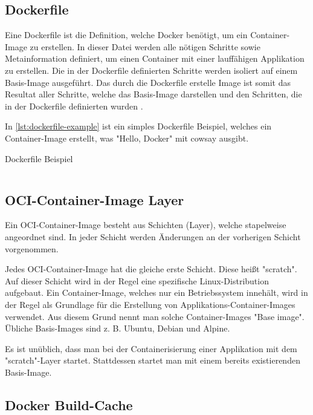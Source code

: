 \subsection{Dockerfile}

Eine Dockerfile ist die Definition, welche Docker benötigt, um ein Container-Image zu erstellen. In dieser Datei werden alle nötigen Schritte sowie Metainformation definiert, um einen Container mit einer lauffähigen Applikation zu erstellen. Die in der Dockerfile definierten Schritte werden isoliert auf einem Basis-Image ausgeführt. Das durch die Dockerfile erstelle Image ist somit das Resultat aller Schritte, welche das Basis-Image darstellen und den Schritten, die in der Dockerfile definierten wurden \cite{dockerDockerfileOverview}.

In \cref{lst:dockerfile-example} ist ein simples Dockerfile Beispiel, welches ein Container-Image erstellt, was "Hello, Docker" mit cowsay ausgibt.

\begin{listing}[H]
    \caption{Dockerfile Beispiel}
    \label{lst:dockerfile-example}
    \inputminted{docker}{./code-examples/Dockerfile.example}
\end{listing}


\subsection{OCI-Container-Image Layer}

Ein OCI-Container-Image besteht aus Schichten (Layer), welche stapelweise angeordnet sind. In jeder Schicht werden Änderungen an der vorherigen Schicht vorgenommen. 

Jedes OCI-Container-Image hat die gleiche erste Schicht. Diese heißt "scratch". Auf dieser Schicht wird in der Regel eine spezifische Linux-Distribution aufgebaut. Ein Container-Image, welches nur ein Betriebssystem innehält, wird in der Regel als Grundlage für die Erstellung von Applikations-Container-Images verwendet. Aus diesem Grund nennt man solche Container-Images "Base image". Übliche Basis-Images sind z. B. Ubuntu, Debian und Alpine. 

Es ist unüblich, dass man bei der Containerisierung einer Applikation mit dem "scratch"-Layer startet. Stattdessen startet man mit einem bereits existierenden Basis-Image.

\subsection{Docker Build-Cache} \label{sec:bg-docker-cache}

